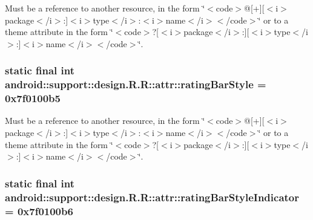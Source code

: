 Must be a reference to another resource, in the form \char`\"{}$<$code$>$@\mbox{[}+\mbox{]}\mbox{[}$<$i$>$package$<$/i$>$:\mbox{]}$<$i$>$type$<$/i$>$:$<$i$>$name$<$/i$>$$<$/code$>$\char`\"{} or to a theme attribute in the form \char`\"{}$<$code$>$?\mbox{[}$<$i$>$package$<$/i$>$:\mbox{]}\mbox{[}$<$i$>$type$<$/i$>$:\mbox{]}$<$i$>$name$<$/i$>$$<$/code$>$\char`\"{}. \hypertarget{classandroid_1_1support_1_1design_1_1_r_1_1attr_ecbd3b7a9fcca05672b596da9fd08221}{
\subsubsection[{ratingBarStyle}]{\setlength{\rightskip}{0pt plus 5cm}static final int android::support::design.R.R::attr::ratingBarStyle = 0x7f0100b5}}
\label{classandroid_1_1support_1_1design_1_1_r_1_1attr_ecbd3b7a9fcca05672b596da9fd08221}


Must be a reference to another resource, in the form \char`\"{}$<$code$>$@\mbox{[}+\mbox{]}\mbox{[}$<$i$>$package$<$/i$>$:\mbox{]}$<$i$>$type$<$/i$>$:$<$i$>$name$<$/i$>$$<$/code$>$\char`\"{} or to a theme attribute in the form \char`\"{}$<$code$>$?\mbox{[}$<$i$>$package$<$/i$>$:\mbox{]}\mbox{[}$<$i$>$type$<$/i$>$:\mbox{]}$<$i$>$name$<$/i$>$$<$/code$>$\char`\"{}. \hypertarget{classandroid_1_1support_1_1design_1_1_r_1_1attr_45e17b230fbc72e2b13b56ae12abc135}{
\subsubsection[{ratingBarStyleIndicator}]{\setlength{\rightskip}{0pt plus 5cm}static final int android::support::design.R.R::attr::ratingBarStyleIndicator = 0x7f0100b6}}
\label{classandroid_1_1support_1_1design_1_1_r_1_1attr_45e17b230fbc72e2b13b56ae12abc135}


